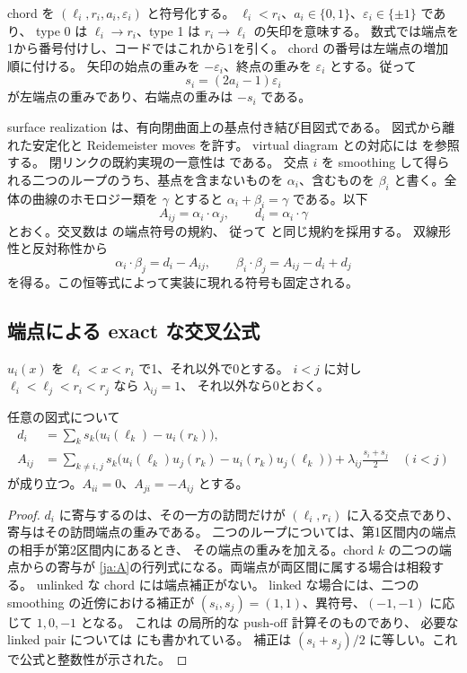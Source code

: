 \documentclass[12pt]{amsart}
\theoremstyle{definition}
\theoremstyle{remark}
\numberwithin{equation}{section}
\newcommand{\eps}{\varepsilon}
\begin{document}
chord を $(\ell_i,r_i,a_i,\eps_i)$ と符号化する。
$\ell_i<r_i$、$a_i\in\{0,1\}$、$\eps_i\in\{\pm1\}$ であり、
type 0 は $\ell_i\to r_i$、type 1 は $r_i\to\ell_i$ の矢印を意味する。
数式では端点を1から番号付けし、コードではこれから1を引く。
chord の番号は左端点の増加順に付ける。
矢印の始点の重みを $-\eps_i$、終点の重みを $\eps_i$ とする。従って
\begin{equation}\label{ja:s}
s_i=(2a_i-1)\eps_i
\end{equation}
が左端点の重みであり、右端点の重みは $-s_i$ である。

surface realization は、有向閉曲面上の基点付き結び目図式である。
図式から離れた安定化と Reidemeister moves を許す。
virtual diagram との対応には
\cite[Theorem 3.3, Proposition 3.4]{CKS} を参照する。
閉リンクの既約実現の一意性は \cite[Theorem 1]{Kuperberg} である。
交点 $i$ を smoothing して得られる二つのループのうち、基点を含まないものを
$\alpha_i$、含むものを $\beta_i$ と書く。全体の曲線のホモロジー類を
$\gamma$ とすると $\alpha_i+\beta_i=\gamma$ である。以下
\[
A_{ij}=\alpha_i\cdot\alpha_j,\qquad d_i=\alpha_i\cdot\gamma
\]
とおく。交叉数は \cite[\S3, Lemmas 3.1--3.2]{HNNS} の端点符号の規約、
従って \cite[\S3]{SW} と同じ規約を採用する。
双線形性と反対称性から
\begin{equation}\label{ja:bilinear}
\alpha_i\cdot\beta_j=d_i-A_{ij},\qquad
\beta_i\cdot\beta_j=A_{ij}-d_i+d_j
\end{equation}
を得る。この恒等式によって実装に現れる符号も固定される。

\subsection{端点による exact な交叉公式}
$u_i(x)$ を $\ell_i<x<r_i$ で1、それ以外で0とする。
$i<j$ に対し $\ell_i<\ell_j<r_i<r_j$ なら $\lambda_{ij}=1$、
それ以外なら0とおく。
\begin{jlem}[交叉公式]\label{ja:intersection}
任意の図式について
\begin{align}
d_i&=\sum_k s_k\bigl(u_i(\ell_k)-u_i(r_k)\bigr),\label{ja:d}\\
A_{ij}&=\sum_{k\ne i,j}s_k\bigl(u_i(\ell_k)u_j(r_k)
-u_i(r_k)u_j(\ell_k)\bigr)
+\lambda_{ij}\frac{s_i+s_j}{2}\quad(i<j)\label{ja:A}
\end{align}
が成り立つ。$A_{ii}=0$、$A_{ji}=-A_{ij}$ とする。
\end{jlem}
\begin{proof}
$d_i$ に寄与するのは、その一方の訪問だけが $(\ell_i,r_i)$ に入る交点であり、
寄与はその訪問端点の重みである。
二つのループについては、第1区間内の端点の相手が第2区間内にあるとき、
その端点の重みを加える。chord $k$ の二つの端点からの寄与が
\eqref{ja:A}の行列式になる。両端点が両区間に属する場合は相殺する。
unlinked な chord には端点補正がない。
linked な場合には、二つの smoothing の近傍における補正が
$(s_i,s_j)=(1,1)$、異符号、$(-1,-1)$ に応じて $1,0,-1$ となる。
これは \cite[Lemma 3.2]{HNNS} の局所的な push-off 計算そのものであり、
必要な linked pair については \cite[\S3, Remark 3.3 の後]{SW} にも書かれている。
補正は $(s_i+s_j)/2$ に等しい。これで公式と整数性が示された。
\end{proof}
\end{document}
